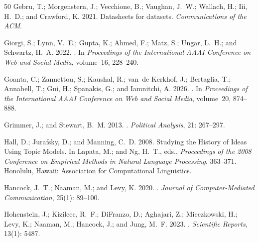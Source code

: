 \begin{thebibliography}{50}
Gebru, T.; Morgenstern, J.; Vecchione, B.; Vaughan, J.~W.; Wallach, H.; Iii, H.~D.; and Crawford, K. 2021.
\newblock Datasheets for datasets.
\newblock \emph{Communications of the ACM}.

Giorgi, S.; Lynn, V.~E.; Gupta, K.; Ahmed, F.; Matz, S.; Ungar, L.~H.; and Schwartz, H.~A. 2022.
.
\newblock In \emph{Proceedings of the International AAAI Conference on Web and Social Media}, volume~16, 228--240.

Goanta, C.; Zannettou, S.; Kaushal, R.; van~de Kerkhof, J.; Bertaglia, T.; Annabell, T.; Gui, H.; Spanakis, G.; and Iamnitchi, A. 2026.
.
\newblock In \emph{Proceedings of the International AAAI Conference on Web and Social Media}, volume~20, 874--888.

Grimmer, J.; and Stewart, B.~M. 2013.
.
\newblock \emph{Political Analysis}, 21: 267--297.

Hall, D.; Jurafsky, D.; and Manning, C.~D. 2008.
\newblock Studying the History of Ideas Using Topic Models.
\newblock In Lapata, M.; and Ng, H.~T., eds., \emph{Proceedings of the 2008 Conference on Empirical Methods in Natural Language Processing}, 363--371. Honolulu, Hawaii: Association for Computational Linguistics.

Hancock, J.~T.; Naaman, M.; and Levy, K. 2020.
.
\newblock \emph{Journal of Computer-Mediated Communication}, 25(1): 89--100.

Hohenstein, J.; Kizilcec, R.~F.; DiFranzo, D.; Aghajari, Z.; Mieczkowski, H.; Levy, K.; Naaman, M.; Hancock, J.; and Jung, M.~F. 2023.
.
\newblock \emph{Scientific Reports}, 13(1): 5487.


\end{thebibliography}
